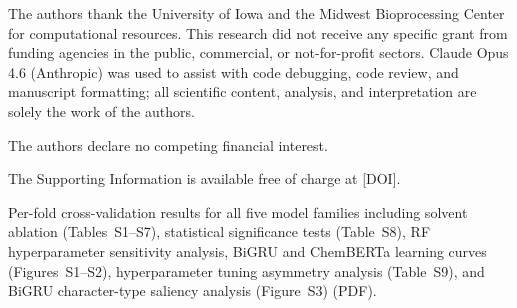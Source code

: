 \documentclass[journal=jcisd8,manuscript=article]{achemso}
\begin{document}
\begin{acknowledgement}
The authors thank the University of Iowa and the Midwest Bioprocessing Center for computational resources.
This research did not receive any specific grant from funding agencies in the public, commercial, or not-for-profit sectors.
Claude Opus 4.6 (Anthropic) was used to assist with code debugging, code review, and manuscript formatting; all scientific content, analysis, and interpretation are solely the work of the authors.
\end{acknowledgement}

The authors declare no competing financial interest.

\begin{suppinfo}
The Supporting Information is available free of charge at [DOI].

Per-fold cross-validation results for all five model families including solvent ablation (Tables~S1--S7), statistical significance tests (Table~S8), RF hyperparameter sensitivity analysis, BiGRU and ChemBERTa learning curves (Figures~S1--S2), hyperparameter tuning asymmetry analysis (Table~S9), and BiGRU character-type saliency analysis (Figure~S3) (PDF).
\end{suppinfo}


\end{document}
